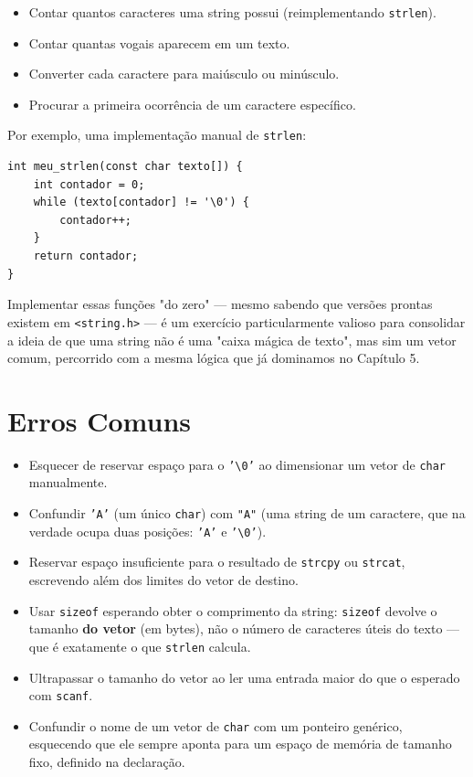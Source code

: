 \documentclass[12pt,a4paper,oneside]{extreport}
\begin{document}
\begin{itemize}
    \item Contar quantos caracteres uma string possui (reimplementando \texttt{strlen}).
    \item Contar quantas vogais aparecem em um texto.
    \item Converter cada caractere para maiúsculo ou minúsculo.
    \item Procurar a primeira ocorrência de um caractere específico.
\end{itemize}

Por exemplo, uma implementação manual de \texttt{strlen}:

\begin{lstlisting}
int meu_strlen(const char texto[]) {
    int contador = 0;
    while (texto[contador] != '\0') {
        contador++;
    }
    return contador;
}
\end{lstlisting}

Implementar essas funções "do zero" — mesmo sabendo que versões prontas existem em \texttt{<string.h>} — é um exercício particularmente valioso para consolidar a ideia de que uma string não é uma "caixa mágica de texto", mas sim um vetor comum, percorrido com a mesma lógica que já dominamos no Capítulo 5.

\section{Erros Comuns}
\label{sec:strings-erros}

\begin{itemize}
    \item Esquecer de reservar espaço para o \texttt{'\textbackslash 0'} ao dimensionar um vetor de \texttt{char} manualmente.
    \item Confundir \texttt{'A'} (um único \texttt{char}) com \texttt{"A"} (uma string de um caractere, que na verdade ocupa duas posições: \texttt{'A'} e \texttt{'\textbackslash 0'}).
    \item Reservar espaço insuficiente para o resultado de \texttt{strcpy} ou \texttt{strcat}, escrevendo além dos limites do vetor de destino.
    \item Usar \texttt{sizeof} esperando obter o comprimento da string: \texttt{sizeof} devolve o tamanho \textbf{do vetor} (em bytes), não o número de caracteres úteis do texto — que é exatamente o que \texttt{strlen} calcula.
    \item Ultrapassar o tamanho do vetor ao ler uma entrada maior do que o esperado com \texttt{scanf}.
    \item Confundir o nome de um vetor de \texttt{char} com um ponteiro genérico, esquecendo que ele sempre aponta para um espaço de memória de tamanho fixo, definido na declaração.
\end{itemize}
\end{document}
